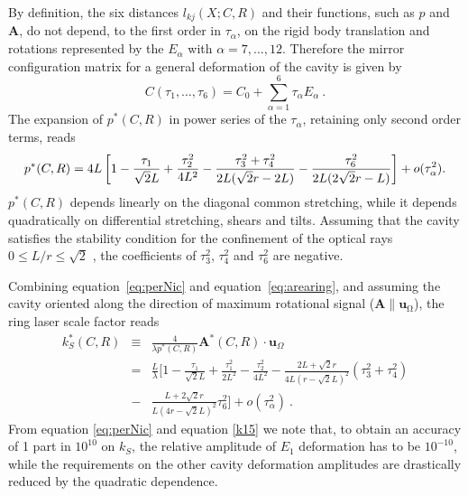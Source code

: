 \documentclass[12pt,a4paper,final]{iopart}
\begin{document}
By definition, the six distances $l_{kj}(X;C,R)$ and their functions,
such as $p$ and $\mathbf{A}$, do not depend, to the first order
in $\tau_{\alpha}$, on the rigid body translation and rotations represented
by the $E_{\alpha}$ with $\alpha=7,\dots,12$. Therefore the mirror
configuration matrix for a general deformation of the cavity is given by
\begin{equation}
C(\tau_{1},\dots,\tau_{6})=C_{0}+\sum_{\alpha=1}^{6}\tau_{\alpha}E_{\alpha}\ \nonumber .
\end{equation}
The expansion of $p^{*}(C,R)$ in power series of the $\tau_{\alpha}$,
retaining only second order terms, reads
\begin{equation}
p^{*}(C,R)=4L\left [1-\frac{\tau_{1}}{\sqrt{2}L}+\frac{\tau_{2}^{2}}{4L^{2}}
-\frac{\tau_{3}^{2}+\tau_{4}^{2}}{2L(\sqrt{2}r-2L)}  \newline
-\frac{\tau_{6}^{2}}{2L(2\sqrt{2}r-L)} \right]+o(\tau_{\alpha}^{2}). \label{eq:perNic}
\end{equation}
$p^{*}(C,R)$ depends linearly on the diagonal common stretching,
while it depends quadratically on differential stretching, shears
and tilts. Assuming that the cavity satisfies the stability condition for the confinement of
the optical rays $0\leq L/r\leq\sqrt{2}$ \cite{SalehBEA}, the coefficients
of $\tau_{3}^{2}$, $\tau_{4}^{2}$ and $\tau^{2}_6$ are negative.

Combining equation~\ref{eq:perNic} and equation~\ref{eq:arearing}, and assuming the cavity 
oriented along the direction of maximum rotational signal ($\mathrm{\mathbf{A}\parallel\mathbf{u}_{\Omega}}$),
the ring laser scale factor reads 
\begin{eqnarray}
k_{S}^{*}(C,R) & \equiv &  \frac{4}{\lambda p^{*}(C,R)}\mathbf{A}^{*}(C,R)\cdot\mathbf{u}_{\Omega} 
\nonumber  \\
& = & \frac{L}{\lambda}\Biggl[1-\frac{\tau_{1}}{\sqrt{2}L}+\frac{\tau_{1}^{2}}{2L^{2}}
-\frac{\tau_{2}^{2}}{4L^{2}}-\frac{2L+\sqrt{2}r}{4L(r-\sqrt{2}L)^{2}}(\tau_{3}^{2}+\tau_{4}^{2}) \nonumber \\
& - & \frac{L+2\sqrt{2}r}{L(4r-\sqrt{2}L)^{2}}\tau_{6}^{2}\Biggl]+o(\tau_{\alpha}^{2})\ \label{k15}.
\end{eqnarray}
From equation \ref{eq:perNic} and equation \ref{k15} we note that, to obtain an accuracy of 1 part in $ 10^{10} $ on $k_{S}$, 
the relative amplitude of $E_1$ deformation has to be $10^{-10}$, while the requirements on the other cavity deformation amplitudes 
are drastically reduced by the quadratic dependence.
\end{document}
